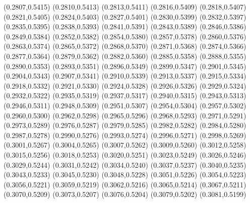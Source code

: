 \PST@Cross(0.2807,0.5415)
\PST@Cross(0.2810,0.5413)
\PST@Cross(0.2813,0.5411)
\PST@Cross(0.2816,0.5409)
\PST@Cross(0.2818,0.5407)
\PST@Cross(0.2821,0.5405)
\PST@Cross(0.2824,0.5403)
\PST@Cross(0.2827,0.5401)
\PST@Cross(0.2830,0.5399)
\PST@Cross(0.2832,0.5397)
\PST@Cross(0.2835,0.5395)
\PST@Cross(0.2838,0.5393)
\PST@Cross(0.2841,0.5391)
\PST@Cross(0.2843,0.5389)
\PST@Cross(0.2846,0.5386)
\PST@Cross(0.2849,0.5384)
\PST@Cross(0.2852,0.5382)
\PST@Cross(0.2854,0.5380)
\PST@Cross(0.2857,0.5378)
\PST@Cross(0.2860,0.5376)
\PST@Cross(0.2863,0.5374)
\PST@Cross(0.2865,0.5372)
\PST@Cross(0.2868,0.5370)
\PST@Cross(0.2871,0.5368)
\PST@Cross(0.2874,0.5366)
\PST@Cross(0.2877,0.5364)
\PST@Cross(0.2879,0.5362)
\PST@Cross(0.2882,0.5360)
\PST@Cross(0.2885,0.5358)
\PST@Cross(0.2888,0.5355)
\PST@Cross(0.2890,0.5353)
\PST@Cross(0.2893,0.5351)
\PST@Cross(0.2896,0.5349)
\PST@Cross(0.2899,0.5347)
\PST@Cross(0.2901,0.5345)
\PST@Cross(0.2904,0.5343)
\PST@Cross(0.2907,0.5341)
\PST@Cross(0.2910,0.5339)
\PST@Cross(0.2913,0.5337)
\PST@Cross(0.2915,0.5334)
\PST@Cross(0.2918,0.5332)
\PST@Cross(0.2921,0.5330)
\PST@Cross(0.2924,0.5328)
\PST@Cross(0.2926,0.5326)
\PST@Cross(0.2929,0.5324)
\PST@Cross(0.2932,0.5322)
\PST@Cross(0.2935,0.5319)
\PST@Cross(0.2937,0.5317)
\PST@Cross(0.2940,0.5315)
\PST@Cross(0.2943,0.5313)
\PST@Cross(0.2946,0.5311)
\PST@Cross(0.2948,0.5309)
\PST@Cross(0.2951,0.5307)
\PST@Cross(0.2954,0.5304)
\PST@Cross(0.2957,0.5302)
\PST@Cross(0.2960,0.5300)
\PST@Cross(0.2962,0.5298)
\PST@Cross(0.2965,0.5296)
\PST@Cross(0.2968,0.5293)
\PST@Cross(0.2971,0.5291)
\PST@Cross(0.2973,0.5289)
\PST@Cross(0.2976,0.5287)
\PST@Cross(0.2979,0.5285)
\PST@Cross(0.2982,0.5282)
\PST@Cross(0.2984,0.5280)
\PST@Cross(0.2987,0.5278)
\PST@Cross(0.2990,0.5276)
\PST@Cross(0.2993,0.5274)
\PST@Cross(0.2996,0.5271)
\PST@Cross(0.2998,0.5269)
\PST@Cross(0.3001,0.5267)
\PST@Cross(0.3004,0.5265)
\PST@Cross(0.3007,0.5262)
\PST@Cross(0.3009,0.5260)
\PST@Cross(0.3012,0.5258)
\PST@Cross(0.3015,0.5256)
\PST@Cross(0.3018,0.5253)
\PST@Cross(0.3020,0.5251)
\PST@Cross(0.3023,0.5249)
\PST@Cross(0.3026,0.5246)
\PST@Cross(0.3029,0.5244)
\PST@Cross(0.3031,0.5242)
\PST@Cross(0.3034,0.5240)
\PST@Cross(0.3037,0.5237)
\PST@Cross(0.3040,0.5235)
\PST@Cross(0.3043,0.5233)
\PST@Cross(0.3045,0.5230)
\PST@Cross(0.3048,0.5228)
\PST@Cross(0.3051,0.5226)
\PST@Cross(0.3054,0.5223)
\PST@Cross(0.3056,0.5221)
\PST@Cross(0.3059,0.5219)
\PST@Cross(0.3062,0.5216)
\PST@Cross(0.3065,0.5214)
\PST@Cross(0.3067,0.5211)
\PST@Cross(0.3070,0.5209)
\PST@Cross(0.3073,0.5207)
\PST@Cross(0.3076,0.5204)
\PST@Cross(0.3079,0.5202)
\PST@Cross(0.3081,0.5199)

